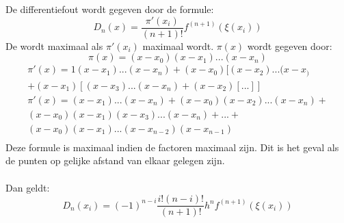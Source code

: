 De differentiefout wordt gegeven door de formule:
\[
D_n(x)= \frac{\pi'(x_i)}{(n+1)!} f^{(n+1)}(\xi(x_i))
\]
De wordt maximaal als $\pi'(x_i)$ maximaal wordt. $\pi(x)$ wordt gegeven door:
\[
\pi(x) = (x-x_0)(x-x_1)...(x-x_n)
\]
\[
\begin{array}{l}
\pi'(x) = 1(x-x_1)...(x-x_n)+(x-x_0)[(x-x_2)...(x-x_)  \\
+(x-x_1)[(x-x_3)...(x-x_n)+(x-x_2)[...]] \\
\pi'(x) =(x-x_1)...(x-x_n)+(x-x_0)(x-x_2)...(x-x_n)+  \\
(x-x_0)(x-x_1)(x-x_3)...(x-x_n)+...+ \\
(x-x_0)(x-x_1)...(x-x_{n-2})(x-x_{n-1})\\
\end{array}
\]
Deze formule is maximaal indien de factoren maximaal zijn. Dit is het geval als de punten op gelijke afstand van elkaar gelegen zijn.\\
\\
Dan geldt:
\[
D_n(x_i) = (-1)^{n-i}\frac{i!(n-i)!}{(n+1)!}h^{n}f^{(n+1)}(\xi(x_i))
\]